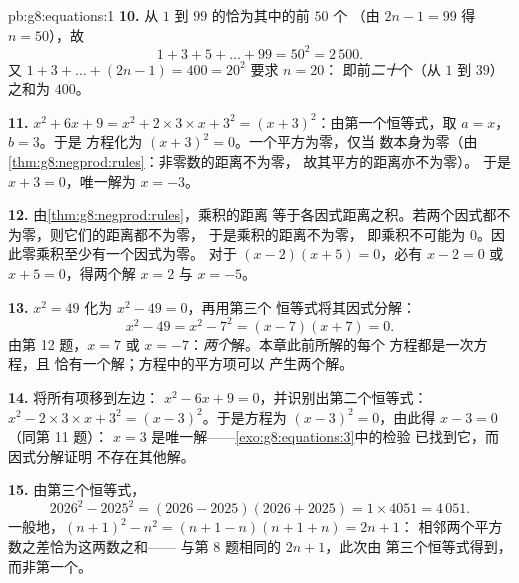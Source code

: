 \begin{solution}{pb:g8:equations:1}
\textbf{10.} 从 $1$ 到 $99$ 的恰为其中的前 $50$ 个
（由 $2n - 1 = 99$ 得 $n = 50$），故
\[
1 + 3 + 5 + \dots + 99 = 50^2 = 2\,500 .
\]
又 $1 + 3 + \dots + (2n - 1) = 400 = 20^2$ 要求 $n = 20$：
即前\emph{二十}个（从 $1$ 到 $39$）之和为
$400$。

\textbf{11.} $x^2 + 6x + 9 = x^2 + 2 \times 3 \times x + 3^2 =
(x + 3)^2$：由第一个恒等式，取 $a = x$，$b = 3$。于是
方程化为 $(x + 3)^2 = 0$。一个平方为零，仅当
数本身为零（由\cref{thm:g8:negprod:rules}：非零数的距离不为零，
故其平方的距离亦不为零）。
于是 $x + 3 = 0$，唯一解为 $x = -3$。

\textbf{12.} 由\cref{thm:g8:negprod:rules}，乘积的距离
等于各因式距离之积。若两个因式都不为零，则它们的距离都不为零，
于是乘积的距离不为零，
即乘积不可能为 $0$。因此零乘积至少有一个因式为零。
对于 $(x - 2)(x + 5) = 0$，必有
$x - 2 = 0$ 或 $x + 5 = 0$，得两个解 $x = 2$ 与
$x = -5$。

\textbf{13.} $x^2 = 49$ 化为 $x^2 - 49 = 0$，再用第三个
恒等式将其因式分解：
\[
x^2 - 49 = x^2 - 7^2 = (x - 7)(x + 7) = 0 .
\]
由第 12 题，$x = 7$ 或 $x = -7$：\emph{两个}解。本章此前所解的每个
方程都是一次方程，且
恰有一个解；方程中的平方项可以
产生两个解。

\textbf{14.} 将所有项移到左边：
$x^2 - 6x + 9 = 0$，并识别出第二个恒等式：
$x^2 - 2 \times 3 \times x + 3^2 = (x - 3)^2$。于是方程为
$(x - 3)^2 = 0$，由此得 $x - 3 = 0$（同第 11 题）：
$x = 3$ 是唯一解——\cref{exo:g8:equations:3}中的检验
已找到它，而因式分解证明
不存在其他解。

\textbf{15.} 由第三个恒等式，
\[
2026^2 - 2025^2 = (2026 - 2025)(2026 + 2025)
= 1 \times 4051 = 4\,051 .
\]
一般地，$(n+1)^2 - n^2 = (n + 1 - n)(n + 1 + n) = 2n + 1$：
相邻两个平方数之差恰为这两数之和——
与第 8 题相同的 $2n + 1$，此次由
第三个恒等式得到，而非第一个。
\end{solution}
